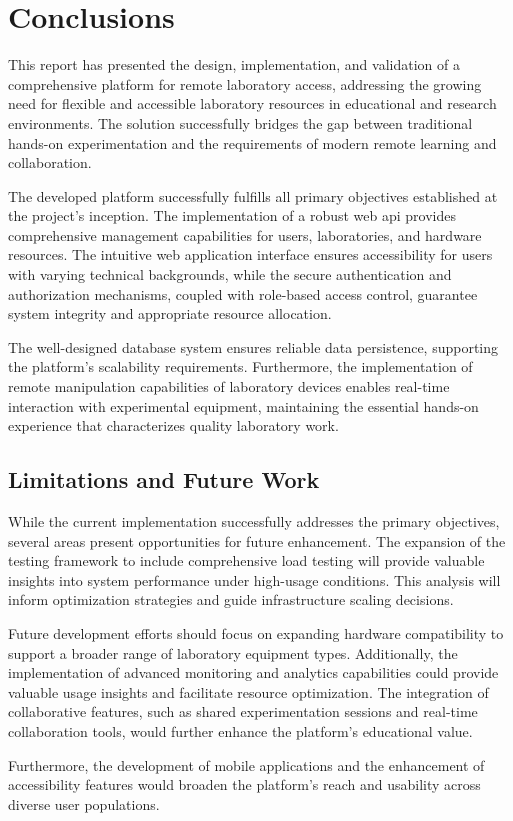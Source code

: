 \chapter{Conclusions}
\label{cap:conclusions}

This report has presented the design, implementation, and validation of a comprehensive platform for remote laboratory access, addressing the growing need for flexible and accessible laboratory resources in educational and research environments. The solution successfully bridges the gap between traditional hands-on experimentation and the requirements of modern remote learning and collaboration.

The developed platform successfully fulfills all primary objectives established at the project's inception. The implementation of a robust web \acs{api} provides comprehensive management capabilities for users, laboratories, and hardware resources. The intuitive web application interface ensures accessibility for users with varying technical backgrounds, while the secure authentication and authorization mechanisms, coupled with role-based access control, guarantee system integrity and appropriate resource allocation.

The well-designed database system ensures reliable data persistence, supporting the platform's scalability requirements. Furthermore, the implementation of remote manipulation capabilities of laboratory devices enables real-time interaction with experimental equipment, maintaining the essential hands-on experience that characterizes quality laboratory work.

\section{Limitations and Future Work}
\label{sec:limitations_future_work}

While the current implementation successfully addresses the primary objectives, several areas present opportunities for future enhancement. The expansion of the testing framework to include comprehensive load testing will provide valuable insights into system performance under high-usage conditions. This analysis will inform optimization strategies and guide infrastructure scaling decisions.

Future development efforts should focus on expanding hardware compatibility to support a broader range of laboratory equipment types. Additionally, the implementation of advanced monitoring and analytics capabilities could provide valuable usage insights and facilitate resource optimization. The integration of collaborative features, such as shared experimentation sessions and real-time collaboration tools, would further enhance the platform's educational value.

Furthermore, the development of mobile applications and the enhancement of accessibility features would broaden the platform's reach and usability across diverse user populations.